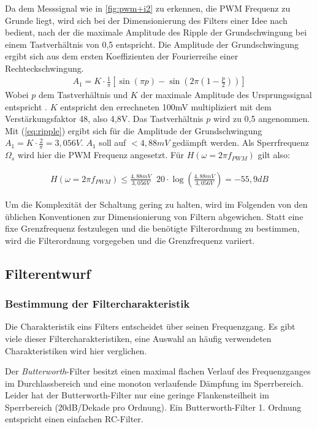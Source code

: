 Da dem Messsignal wie in \cref{fig:pwm+i2} zu erkennen, die PWM Frequenz zu Grunde liegt, wird sich bei der Dimensionierung des Filters einer Idee nach \cite{Alter2008} bedient, nach der die maximale Amplitude des Ripple der Grundschwingung bei einem
Tastverhältnis von 0,5 ent\-spricht. Die Amplitude der Grundschwingung ergibt sich aus dem ersten Koeffizienten der Fourierreihe einer Rechteckschwingung.
\begin{align}
A_1 = K\cdot \frac{1}{\pi}[\sin(\pi p)-\sin(2\pi(1-\frac{p}{2}))]
\label{eq:ripple}
\end{align}
Wobei $p$ dem Tastverhältnis und $K$ der maximale Amplitude des Ursprungssignal entspricht \cite{Alter2008}. $K$ entspricht den errechneten 100mV multipliziert mit dem Verstärkungsfaktor 48, also 4,8V. 
Das Tastverhältnis $p$ wird zu 0,5
angenommen. Mit (\ref{eq:ripple}) ergibt sich für die Amplitude der Grundschwingung $ A_1 = K\cdot \frac{2}{\pi} = 3,056V$. $A_1$ soll auf $ < 4,88mV$ gedämpft werden.
Als Sperrfrequenz $\Omega_s $ wird hier die PWM Frequenz angesetzt. Für $H(\omega=2\pi f_{PWM})$ gilt also:

\begin{align}
H(\omega=2\pi f_{PWM}) \le \frac{4,88mV}{3,056V} \mathop{\hat{=}} 20\cdot\log(\frac{4,88mV}{3,056V})= -55,9 dB
\label{eq:daempfung}
\end{align}

Um die Komplexität der Schaltung gering zu halten, wird im Folgenden von den üblichen Konventionen zur Dimensionierung von Filtern abgewichen.
Statt eine fixe Grenzfrequenz festzulegen und die benötigte Filterordnung zu bestimmen, wird die Filterordnung vorgegeben und die Grenzfrequenz variiert.

\subsection{Filterentwurf}

\subsubsection{Bestimmung der Filtercharakteristik}

Die Charakteristik eins Filters entscheidet über seinen Frequenzgang. Es gibt viele dieser Filtercharakteristiken, eine Auswahl an häufig verwendeten Charakteristiken wird hier verglichen.

Der \emph{Butterworth}-Filter besitzt einen maximal flachen Verlauf des Frequenzganges im Durchlassbereich und eine monoton verlaufende Dämpfung im Sperrbereich.
Leider hat der Butterworth-Filter nur eine geringe Flankensteilheit im Sperrbereich (20dB/Dekade pro Ordnung). Ein Butterworth-Filter 1. Ordnung entspricht einen  einfachen RC-Filter.

